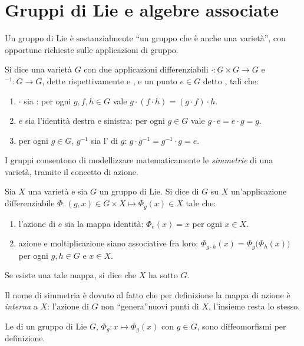 \section{Gruppi di Lie e algebre associate}
Un gruppo di Lie è sostanzialmente \textquotedblleft un gruppo che è anche una varietà\textquotedblright, con opportune richieste sulle applicazioni di gruppo.
\begin{definition}
  Si dice  una varietà $G$ con due applicazioni differenziabili $\cdot: G \times G \to G$ e ${}^{-1}: G\to G$, dette rispettivamente  e , e un punto $e \in G$ detto , tali che:
  \begin{enumerate}
    \item $\cdot $ sia : per ogni $g,f,h \in G$ vale $g\cdot (f\cdot h) = (g\cdot f) \cdot h$.
    \item $e$ sia l'identità destra e sinistra: per ogni $g \in G$ vale $g \cdot e = e \cdot g = g$.
    \item per ogni $g \in G$, $g^{-1}$ sia l' di $g$: $g \cdot g^{-1} = g^{-1}\cdot g = e$.
  \end{enumerate}
\end{definition}

I gruppi consentono di modellizzare matematicamente le \emph{simmetrie} di una varietà, tramite il concetto di azione.
\begin{definition}
  Sia $X$ una varietà e sia $G$ un gruppo di Lie. Si dice  di $G$ su $X$ un'applicazione differenziabile $\Phi:(g,x) \in G \times X \mapsto \Phi_g(x) \in X$ tale che:
  \begin{enumerate}
    \item l'azione di $e$ sia la mappa identità: $\Phi_e (x) = x$ per ogni $x \in X$.
    \item azione e moltiplicazione siano associative fra loro: $\Phi_{g\cdot h} (x) = \Phi_g \big(\Phi_h (x)\big)$ per ogni $g,h \in G$ e $x \in X$.
  \end{enumerate}
Se esiste una tale mappa, si dice che $X$ ha  sotto $G$. 
\end{definition}
\begin{remark}
  Il nome di simmetria è dovuto al fatto che per definizione la mappa di azione è \emph{interna} a $X$: l'azione di $G$ non \textquotedblleft genera\textquotedblright nuovi punti di $X$, l'insieme resta lo stesso.
\end{remark}
\begin{remark}
  Le  di un gruppo di Lie $G$, $\Phi_g: x \mapsto \Phi_g(x)$ con $g \in G$, sono diffeomorfismi per definizione.
\end{remark}


